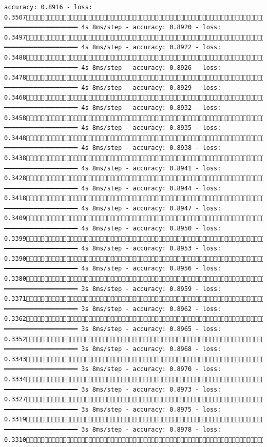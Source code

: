 \documentclass[
  letterpaper,
  DIV=11,
  numbers=noendperiod]{scrreprt}
\begin{document}
\begin{verbatim}
accuracy: 0.8916 - loss: 0.35071301/1875 ━━━━━━━━━━━━━━━━━━━━ 4s 8ms/step - accuracy: 0.8920 - loss: 0.34971307/1875 ━━━━━━━━━━━━━━━━━━━━ 4s 8ms/step - accuracy: 0.8922 - loss: 0.34881314/1875 ━━━━━━━━━━━━━━━━━━━━ 4s 8ms/step - accuracy: 0.8926 - loss: 0.34781321/1875 ━━━━━━━━━━━━━━━━━━━━ 4s 8ms/step - accuracy: 0.8929 - loss: 0.34681328/1875 ━━━━━━━━━━━━━━━━━━━━ 4s 8ms/step - accuracy: 0.8932 - loss: 0.34581335/1875 ━━━━━━━━━━━━━━━━━━━━ 4s 8ms/step - accuracy: 0.8935 - loss: 0.34481342/1875 ━━━━━━━━━━━━━━━━━━━━ 4s 8ms/step - accuracy: 0.8938 - loss: 0.34381349/1875 ━━━━━━━━━━━━━━━━━━━━ 4s 8ms/step - accuracy: 0.8941 - loss: 0.34281356/1875 ━━━━━━━━━━━━━━━━━━━━ 4s 8ms/step - accuracy: 0.8944 - loss: 0.34181363/1875 ━━━━━━━━━━━━━━━━━━━━ 4s 8ms/step - accuracy: 0.8947 - loss: 0.34091370/1875 ━━━━━━━━━━━━━━━━━━━━ 4s 8ms/step - accuracy: 0.8950 - loss: 0.33991377/1875 ━━━━━━━━━━━━━━━━━━━━ 4s 8ms/step - accuracy: 0.8953 - loss: 0.33901384/1875 ━━━━━━━━━━━━━━━━━━━━ 4s 8ms/step - accuracy: 0.8956 - loss: 0.33801391/1875 ━━━━━━━━━━━━━━━━━━━━ 3s 8ms/step - accuracy: 0.8959 - loss: 0.33711398/1875 ━━━━━━━━━━━━━━━━━━━━ 3s 8ms/step - accuracy: 0.8962 - loss: 0.33621405/1875 ━━━━━━━━━━━━━━━━━━━━ 3s 8ms/step - accuracy: 0.8965 - loss: 0.33521412/1875 ━━━━━━━━━━━━━━━━━━━━ 3s 8ms/step - accuracy: 0.8968 - loss: 0.33431419/1875 ━━━━━━━━━━━━━━━━━━━━ 3s 8ms/step - accuracy: 0.8970 - loss: 0.33341425/1875 ━━━━━━━━━━━━━━━━━━━━ 3s 8ms/step - accuracy: 0.8973 - loss: 0.33271431/1875 ━━━━━━━━━━━━━━━━━━━━ 3s 8ms/step - accuracy: 0.8975 - loss: 0.33191438/1875 ━━━━━━━━━━━━━━━━━━━━ 3s 8ms/step - accuracy: 0.8978 - loss: 0.33101445/1875 
\end{verbatim}
\end{document}
